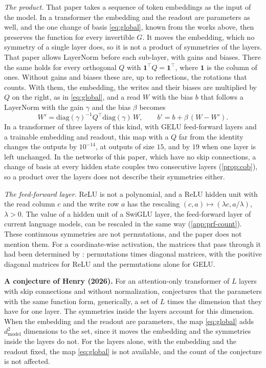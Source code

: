 \documentclass[10pt]{article}
\theoremstyle{definition}
\theoremstyle{remark}
\newcommand{\dm}{d_{\mathrm{model}}}
\newcommand{\para}[1]{\smallskip\noindent\textbf{#1}\hspace{0.5em}}
\begin{document}
\emph{The product.} That paper takes a sequence of token embeddings as the input of the model. In a transformer the embedding and the readout are parameters as well, and the one change of basis \eqref{eq:global}, known from the works above, then preserves the function for every invertible $G$. It moves the embedding, which no symmetry of a single layer does, so it is not a product of symmetries of the layers. That paper allows LayerNorm before each sub-layer, with gains and biases. There the same holds for every orthogonal $Q$ with $\mathbf 1^\top Q = \mathbf 1^\top$, where $\mathbf 1$ is the column of ones. Without gains and biases these are, up to reflections, the rotations that \citet{vannierop2024gauge} counts. With them, the embedding, the writes and their biases are multiplied by $Q$ on the right, as in \eqref{eq:global}, and a read $W$ with the bias $b$ that follows a LayerNorm with the gain $\gamma$ and the bias $\beta$ becomes
\[
W' = \mathrm{diag}(\gamma)^{-1}Q^\top\mathrm{diag}(\gamma)\,W, \qquad b' = b + \beta\,(W - W') .
\]
In a transformer of three layers of this kind, with GELU feed-forward layers and a trainable embedding and readout, this map with a $Q$ far from the identity changes the outputs by $10^{-14}$, at outputs of size $15$, and by $19$ when one layer is left unchanged. In the networks of this paper, which have no skip connections, a change of basis at every hidden state couples two consecutive layers (\cref{prop:cob}), so a product over the layers does not describe their symmetries either.

\emph{The feed-forward layer.} ReLU is not a polynomial, and a ReLU hidden unit with the read column $c$ and the write row $a$ has the rescaling $(c, a) \mapsto (\lambda c, a/\lambda)$, $\lambda > 0$. The value of a hidden unit of a SwiGLU layer, the feed-forward layer of current language models, can be rescaled in the same way (\cref{app:prf-count}). These continuous symmetries are not permutations, and the paper does not mention them. For a coordinate-wise activation, the matrices that pass through it had been determined by \citet[Theorem~E.14]{godfrey2022symmetries}: permutations times diagonal matrices, with the positive diagonal matrices for ReLU and the permutations alone for GELU.

\para{A conjecture of Henry (2026).} For an attention-only transformer of $L$ layers with skip connections and without normalization, \citet[Conjecture~2.4]{henry2026generic} conjectures that the parameters with the same function form, generically, a set of $L$ times the dimension that they have for one layer. The symmetries inside the layers account for this dimension. When the embedding and the readout are parameters, the map \eqref{eq:global} adds $\dm^2$ dimensions to the set, since it moves the embedding and the symmetries inside the layers do not. For the layers alone, with the embedding and the readout fixed, the map \eqref{eq:global} is not available, and the count of the conjecture is not affected.
\end{document}

